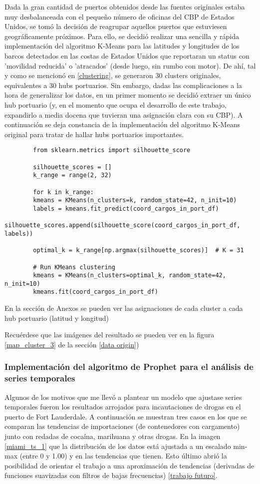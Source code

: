\documentclass[12pt]{article}
\begin{document}
	Dada la gran cantidad de puertos obtenidos desde las fuentes originales estaba muy desbalanceada con el pequeño número de oficinas del CBP de Estados Unidos, se tomó la decisión de reagrupar aquellos puertos que estuviesen geográficamente próximos. Para ello, se decidió realizar una sencilla y rápida implementación del algoritmo K-Means para las latitudes y longitudes de los barcos detectados en las costas de Estados Unidos que reportaran un status con 'movilidad reducida' o 'atracados' (desde luego, sin rumbo con motor). De ahí, tal y como se mencionó en \ref{clustering}, se generaron 30 clusters originales, equivalentes a 30 hubs portuarios. Sin embargo, dadas las complicaciones a la hora de generalizar los datos, en un primer momento se decidió extraer un único hub portuario (y, en el momento que ocupa el desarrollo de este trabajo, expandirlo a media docena que tuvieran una asignación clara con su CBP). A continuación se deja constancia de la implementación del algoritmo K-Means original para tratar de hallar hubs portuarios importantes.
	
	\begin{verbatim}
		from sklearn.metrics import silhouette_score
		
		silhouette_scores = []
		k_range = range(2, 32) 
		
		for k in k_range:
		kmeans = KMeans(n_clusters=k, random_state=42, n_init=10)
		labels = kmeans.fit_predict(coord_cargos_in_port_df)
		silhouette_scores.append(silhouette_score(coord_cargos_in_port_df, labels))
		
		optimal_k = k_range[np.argmax(silhouette_scores)]  # K = 31
		
		# Run KMeans clustering
		kmeans = KMeans(n_clusters=optimal_k, random_state=42, n_init=10)
		kmeans.fit(coord_cargos_in_port_df)
	\end{verbatim}

	En la sección de Anexos se pueden ver las asignaciones de cada cluster a cada hub portuario (latitud y longitud)
	
	
	Recuérdese que las imágenes del resultado se pueden ver en la figura \ref{map_cluster_3} de la sección \ref{data origin})
	
	
	\subsubsection{\label{stProphet}Implementación del algoritmo de Prophet para el análisis de series temporales}
	Algunos de los motivos que me llevó a plantear un modelo que ajustase series temporales fueron los resultados arrojados para incautaciones de drogas en el puerto de Fort Lauderdale. A continuación se muestran tres casos en los que se comparan las tendencias de importaciones (de contenedores con cargamento) junto con redadas de cocaína, marihuana y otras drogas. En la imagen \ref{miami_ts_1} que la distribución de los datos está ajustada a un escalado min-max (entre 0 y 1.00) y en las tendencias que tienen. Esto último abrió la posibilidad de orientar el trabajo a una aproximación de tendencias (derivadas de funciones suavizadas con filtros de bajas frecuencias) \ref{trabajo futuro}.
	
\end{document}
